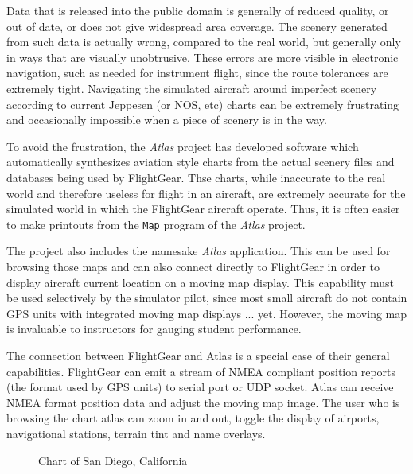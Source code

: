 \documentclass[a4paper,10pt]{article}
\begin{document}
Data that is released into the public domain is generally of reduced
quality, or out of date, or does not give widespread area coverage.
The scenery generated from such data is actually wrong, compared to
the real world, but generally only in ways that are visually unobtrusive.
These errors are more visible in electronic navigation, such as needed
for instrument flight, since the route tolerances are extremely tight.
Navigating the simulated aircraft around imperfect scenery according to 
current Jeppesen (or NOS, etc) charts can be extremely frustrating
and occasionally impossible when a piece of scenery is in the way.

%
To avoid the frustration, the \textsl{Atlas} project\cite{atlas}
has developed
software which automatically synthesizes aviation style charts
from the actual scenery files and databases being used by FlightGear.
Thse charts, while inaccurate to the real world and therefore useless
for flight in an aircraft, are extremely accurate for the simulated
world in which the FlightGear aircraft operate.
Thus, it is often easier to make printouts
from the {\tt Map} program of the \textsl{Atlas} project.

The project also includes the namesake \textsl{Atlas} application.
This can be used for browsing those maps
and can also connect directly to FlightGear in order to display aircraft
current location on a moving map display.  This capability must be used
selectively by the simulator pilot, since most small aircraft do not contain
GPS units with integrated moving map displays ... yet.  However, the
moving map is invaluable to instructors for gauging student performance.

The connection between FlightGear and Atlas is a special case of their
general capabilities.  FlightGear can emit a stream of NMEA compliant
position reports (the format used by GPS units) to serial port or UDP socket.
Atlas can receive NMEA format position data and adjust the moving map image.
The user who is browsing the chart atlas can zoom in and out, toggle the
display of airports, navigational stations, terrain tint and name overlays.
%
\begin{figure}
\begin{center}\end{center}
\caption{Chart of San Diego, California}
\label{fig:atlassan}
\end{figure}
%
%
\end{document}
